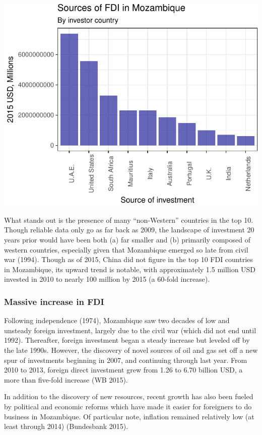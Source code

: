 \documentclass[]{article}
\begin{document}
\begin{center}\includegraphics{figures/unnamed-chunk-7-1} \end{center}

What stands out is the presence of many ``non-Western'' countries in the
top 10. Though reliable data only go as far back as 2009, the landscape
of investment 20 years prior would have been both (a) far smaller and
(b) primarily composed of western countries, especially given that
Mozambique emerged so late from civil war (1994). Though as of 2015,
China did not figure in the top 10 FDI countries in Mozambique, its
upward trend is notable, with approximately 1.5 million USD invested in
2010 to nearly 100 million by 2015 (a 60-fold increase).

\subsubsection{Massive increase in FDI}\label{massive-increase-in-fdi}

Following independence (1974), Mozambique saw two decades of low and
unsteady foreign investment, largely due to the civil war (which did not
end until 1992). Thereafter, foreign investment began a steady increase
but leveled off by the late 1990s. However, the discovery of novel
sources of oil and gas set off a new spur of investments beginning in
2007, and continuing through last year. From 2010 to 2013, foreign
direct investment grew from 1.26 to 6.70 billion USD, a more than
five-fold increase (WB 2015).

In addition to the discovery of new resources, recent growth has also
been fueled by political and economic reforms which have made it easier
for foreigners to do business in Mozambique. Of particular note,
inflation remained relatively low (at least through 2014) (Bundesbank
2015).
\end{document}
